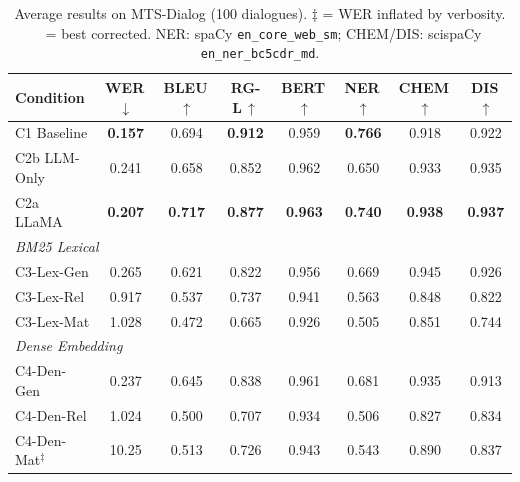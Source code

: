 \documentclass[11pt,a4paper,twocolumn]{article}
\newcommand{\up}{\textcolor{green!60!black}{$\uparrow$}}
\newcommand{\dn}{\textcolor{red!70!black}{$\downarrow$}}
\newcommand{\best}{\checkmark}
\newcommand{\bestnum}[1]{\textbf{#1}}
\begin{document}
\begin{table}[!t]
\centering
\caption{Average results on MTS-Dialog (100 dialogues). $\ddagger$ = WER
inflated by verbosity. \best\ = best corrected. NER: spaCy
\texttt{en\_core\_web\_sm}; CHEM/DIS: scispaCy \texttt{en\_ner\_bc5cdr\_md}.}
\label{tab:mts}
\footnotesize
\setlength{\tabcolsep}{3.5pt}
\renewcommand{\arraystretch}{1.1}
\begin{tabular}{lccccccc}
\toprule
\textbf{Condition} & \textbf{WER\,\dn} & \textbf{BLEU\,\up} & \textbf{RG-L\,\up} & \textbf{BERT\,\up} & \textbf{NER\,\up} & \textbf{CHEM\,\up} & \textbf{DIS\,\up} \\
\midrule
C1 Baseline     & \bestnum{0.157} & 0.694 & \bestnum{0.912} & 0.959 & \bestnum{0.766} & 0.918 & 0.922 \\
\midrule
C2b LLM-Only    & 0.241 & 0.658 & 0.852 & 0.962 & 0.650 & 0.933 & 0.935 \\
C2a LLaMA~\best & \bestnum{0.207} & \bestnum{0.717} & \bestnum{0.877} & \bestnum{0.963} & \bestnum{0.740} & \bestnum{0.938} & \bestnum{0.937} \\
\midrule
\multicolumn{8}{l}{\small\textit{BM25 Lexical}} \\
C3-Lex-Gen      & 0.265  & 0.621 & 0.822 & 0.956 & 0.669 & 0.945 & 0.926 \\
C3-Lex-Rel      & 0.917  & 0.537 & 0.737 & 0.941 & 0.563 & 0.848 & 0.822 \\
C3-Lex-Mat      & 1.028  & 0.472 & 0.665 & 0.926 & 0.505 & 0.851 & 0.744 \\
\midrule
\multicolumn{8}{l}{\small\textit{Dense Embedding}} \\
C4-Den-Gen      & 0.237  & 0.645 & 0.838 & 0.961 & 0.681 & 0.935 & 0.913 \\
C4-Den-Rel      & 1.024  & 0.500 & 0.707 & 0.934 & 0.506 & 0.827 & 0.834 \\
C4-Den-Mat$^\ddagger$ & 10.25 & 0.513 & 0.726 & 0.943 & 0.543 & 0.890 & 0.837 \\
\bottomrule
\end{tabular}
\end{table}
\end{document}
